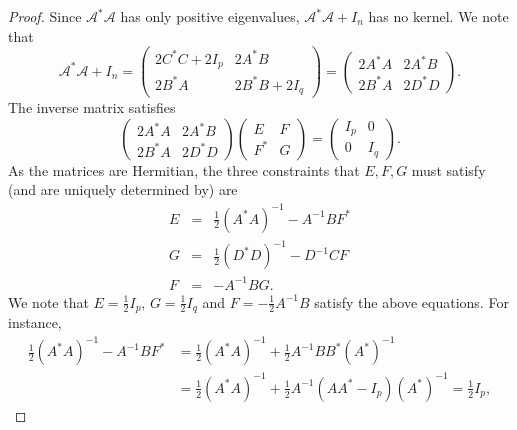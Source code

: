 \begin{proof}
    Since $\mathcal{A}^\ast\mathcal{A}$ has only positive eigenvalues, $\mathcal{A}^\ast\mathcal{A}+I_n$ has no kernel. We note that 
    \begin{displaymath}
        \mathcal{A}^\ast\mathcal{A}+I_n=\left(\begin{array}{cc}
        2C^\ast C+2I_p & 2A^\ast B\\
        2B^\ast A & 2B^\ast B+2I_q
        \end{array}\right)=\left(\begin{array}{cc}
        2A^\ast A & 2A^\ast B\\
        2B^\ast A & 2D^\ast D
        \end{array}\right).
    \end{displaymath}
    The inverse matrix satisfies 
    \begin{displaymath}
        \left(\begin{array}{cc}
        2A^\ast A & 2A^\ast B\\
        2B^\ast A & 2D^\ast D
        \end{array}\right)\left(\begin{array}{cc}
        E & F\\
        F^\ast & G
        \end{array}\right)=\left(\begin{array}{cc}
        I_p & 0\\
        0 & I_q
        \end{array}\right).
    \end{displaymath} 
    As the matrices are Hermitian, the three constraints that $E,F,G$ must satisfy (and are uniquely determined by) are
    \begin{eqnarray*}
        E & = & \textstyle{\frac{1}{2}}(A^\ast A)^{-1}-A^{-1}BF^\ast\\
        G & = & \textstyle{\frac{1}{2}}(D^\ast D)^{-1}-D^{-1}CF\\
        F & = & -A^{-1}BG.
    \end{eqnarray*}
    We note that $E=\frac{1}{2}I_p$, $G=\frac{1}{2}I_q$ and $F=-\frac{1}{2}A^{-1}B$ satisfy the above equations. For instance, 
    \begin{align*}
        \frac{1}{2}(A^\ast A)^{-1}-A^{-1}BF^\ast & = \frac{1}{2}(A^\ast A)^{-1}+\frac{1}{2}A^{-1}BB^\ast (A^{\ast})^{-1} \\
        & = \frac{1}{2}(A^\ast A)^{-1}+\frac{1}{2}A^{-1}(AA^\ast-I_p)(A^{\ast})^{-1}=\frac{1}{2}I_p,
    \end{align*}

\end{proof}

